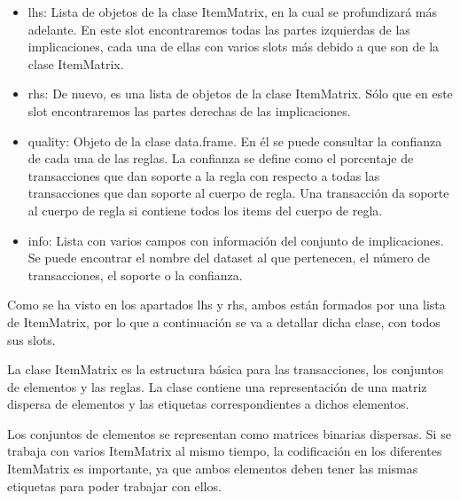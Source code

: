 \begin{itemize}
    \item lhs:
    Lista de objetos de la clase ItemMatrix, en la cual se profundizar\'a m\'as 
    adelante. En este slot encontraremos todas las partes izquierdas de las 
    implicaciones, cada una de ellas con varios slots m\'as debido a que son de la 
    clase ItemMatrix. 

    \item rhs:
    De nuevo, es una lista de objetos de la clase ItemMatrix. S\'olo que en este 
    slot encontraremos las partes derechas de las implicaciones.

    \item quality:
    Objeto de la clase data.frame. En \'el se puede consultar la confianza de cada 
    una de las reglas. La confianza se define como el porcentaje de transacciones 
    que dan soporte a la regla con respecto a todas las transacciones que dan 
    soporte al cuerpo de regla. Una transacci\'on da soporte al cuerpo de regla si 
    contiene todos los items del cuerpo de regla.

    \item info:
    Lista con varios campos con informaci\'on del conjunto de implicaciones. Se puede 
    encontrar el nombre del dataset al que pertenecen, el n\'umero de transacciones, 
    el soporte o la confianza.

\end{itemize}


Como se ha visto en los apartados lhs y rhs, ambos est\'an formados por una lista de 
ItemMatrix, por lo que a continuaci\'on se va a detallar dicha clase, con todos sus slots.

La clase ItemMatrix es la estructura b\'asica para las transacciones, los 
conjuntos de elementos y las reglas.
La clase contiene una representaci\'on de una matriz dispersa de elementos 
y las etiquetas correspondientes a dichos elementos.

Los conjuntos de elementos se representan como matrices binarias dispersas. 
Si se trabaja con varios ItemMatrix al mismo tiempo, la codificaci\'on 
en los diferentes ItemMatrix es importante, ya que ambos elementos deben tener 
las mismas etiquetas para poder trabajar con ellos.


